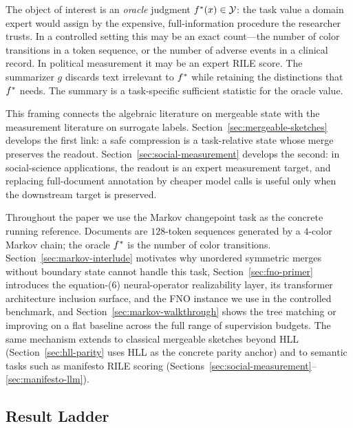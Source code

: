 The object of interest is an \emph{oracle} judgment $f^\ast(x) \in \mathcal{Y}$: the task value a domain expert would assign by the expensive, full-information procedure the researcher trusts. In a controlled setting this may be an exact count---the number of color transitions in a token sequence, or the number of adverse events in a clinical record. In political measurement it may be an expert RILE score. The summarizer $g$ discards text irrelevant to $f^\ast$ while retaining the distinctions that $f^\ast$ needs. The summary is a task-specific sufficient statistic for the oracle value.

This framing connects the algebraic literature on mergeable state with the
measurement literature on surrogate labels. Section~\ref{sec:mergeable-sketches}
develops the first link: a safe compression is a task-relative state whose
merge preserves the readout. Section~\ref{sec:social-measurement} develops
the second: in social-science applications, the readout is an expert
measurement target, and replacing full-document annotation by cheaper model
calls is useful only when the downstream target is preserved.

Throughout the paper we use the Markov changepoint task as the concrete running reference. Documents are $128$-token sequences generated by a $4$-color Markov chain; the oracle $f^\ast$ is the number of color transitions. Section~\ref{sec:markov-interlude} motivates why unordered symmetric merges without boundary state cannot handle this task, Section~\ref{sec:fno-primer} introduces the equation-(6) neural-operator realizability layer, its transformer architecture inclusion surface, and the FNO instance we use in the controlled benchmark, and Section~\ref{sec:markov-walkthrough} shows the tree matching or improving on a flat baseline across the full range of supervision budgets. The same mechanism extends to classical mergeable sketches beyond HLL (Section~\ref{sec:hll-parity} uses HLL as the concrete parity anchor) and to semantic tasks such as manifesto RILE scoring (Sections~\ref{sec:social-measurement}--\ref{sec:manifesto-llm}).

\subsection{Result Ladder}

